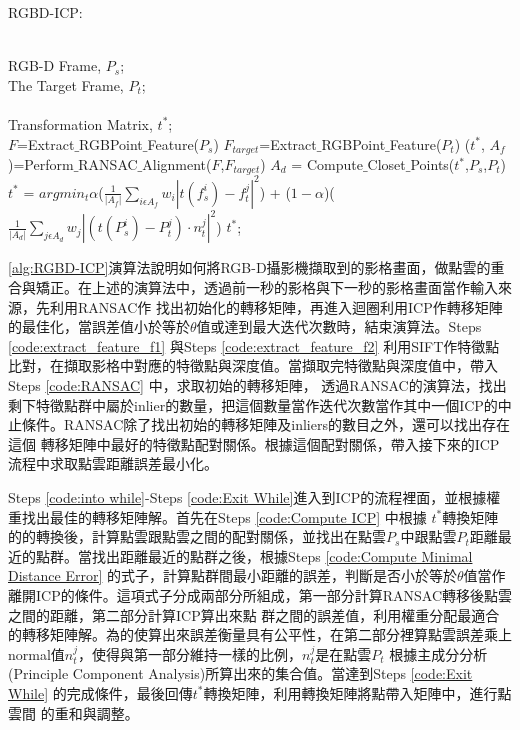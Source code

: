 \begin{algorithm}[htb] 
\renewcommand{\algorithmicrequire}{\textbf{Input:}}
\renewcommand\algorithmicensure {\textbf{Output:} }
\caption{ RGBD-ICP: } %
	\label{alg:RGBD-ICP} %
	\begin{algorithmic}[1] %
	\REQUIRE ~~\\ %
	RGB-D Frame, $P_s$;\\
	The Target Frame, $P_t$;\\
	\ENSURE ~~\\ %
	Transformation Matrix, $t^*$;\\

	\STATE $F$=Extract$\_$RGBPoint$\_$Feature($P_s$) \label{code:extract_feature_f1} 
	\STATE $F_{target}$=Extract$\_$RGBPoint$\_$Feature($P_t$) \label{code:extract_feature_f2}
	\STATE ($t^*$, $A_f$)=Perform$\_$RANSAC$\_$Alignment($F$,$F_{target}$) \label{code:RANSAC}
	\REPEAT \label{code:into while}
		\STATE $A_d$ = Compute$\_$Closet$\_$Points($t^*$,$P_s$,$P_t$) \label{code:Compute ICP}
		\STATE $t^*$ = $argmin_t \alpha$($\frac{1}{|A_f|}\sum_{i \epsilon A_f} w_i|t(f_s^i)-f_t^j|^2$) + ($1-\alpha$)($\frac{1}{|A_d|}\sum_{j \epsilon A_d} w_j|(t(P_s^i)-P_t^j)\cdot n_t^j|^2$) \label{code:Compute Minimal Distance Error}
	 \label{code:Exit While}
	\RETURN $t^*$; %
\end{algorithmic}
\end{algorithm}

	\ref{alg:RGBD-ICP}演算法說明如何將RGB-D攝影機擷取到的影格畫面，做點雲的重合與矯正。在上述的演算法中，透過前一秒的影格與下一秒的影格畫面當作輸入來源，先利用RANSAC作
找出初始化的轉移矩陣，再進入迴圈利用ICP作轉移矩陣的最佳化，當誤差值小於等於$\theta$值或達到最大迭代次數時，結束演算法。Steps \ref{code:extract_feature_f1} 與Steps \ref{code:extract_feature_f2} 利用SIFT作特徵點比對，在擷取影格中對應的特徵點與深度值。當擷取完特徵點與深度值中，帶入Steps \ref{code:RANSAC} 中，求取初始的轉移矩陣，
透過RANSAC的演算法，找出剩下特徵點群中屬於inlier的數量，把這個數量當作迭代次數當作其中一個ICP的中止條件。RANSAC除了找出初始的轉移矩陣及inliers的數目之外，還可以找出存在這個
轉移矩陣中最好的特徵點配對關係。根據這個配對關係，帶入接下來的ICP流程中求取點雲距離誤差最小化。
	
	Steps \ref{code:into while}-Steps \ref{code:Exit While}進入到ICP的流程裡面，並根據權重找出最佳的轉移矩陣解。首先在Steps \ref{code:Compute ICP} 中根據
$t^*$轉換矩陣的的轉換後，計算點雲跟點雲之間的配對關係，並找出在點雲$P_s$中跟點雲$P_t$距離最近的點群。當找出距離最近的點群之後，根據Steps \ref{code:Compute Minimal Distance
Error} 的式子，計算點群間最小距離的誤差，判斷是否小於等於$\theta$值當作離開ICP的條件。這項式子分成兩部分所組成，第一部分計算RANSAC轉移後點雲之間的距離，第二部分計算ICP算出來點
群之間的誤差值，利用權重分配最適合的轉移矩陣解。為的使算出來誤差衡量具有公平性，在第二部分裡算點雲誤差乘上normal值${n_t^j}$，使得與第一部分維持一樣的比例，${n_t^j}$是在點雲$P_t$
根據主成分分析(Principle Component Analysis)所算出來的集合值。當達到Steps \ref{code:Exit While} 的完成條件，最後回傳$t^*$轉換矩陣，利用轉換矩陣將點帶入矩陣中，進行點雲間
的重和與調整。

